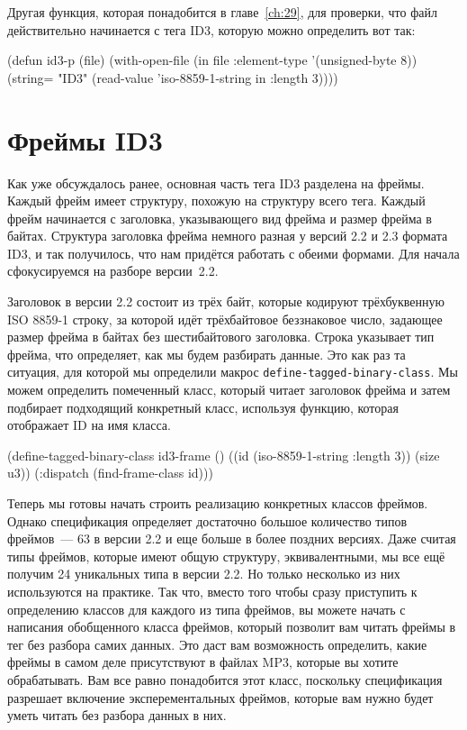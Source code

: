 Другая функция, которая понадобится в главе~\ref{ch:29}, для проверки, что файл
действительно начинается с тега ID3, которую можно определить вот так:

\begin{myverb}
(defun id3-p (file)
  (with-open-file (in file :element-type '(unsigned-byte 8))
    (string= "ID3" (read-value 'iso-8859-1-string in :length 3))))
\end{myverb}

\section{Фреймы ID3}

Как уже обсуждалось ранее, основная часть тега ID3 разделена на фреймы.  Каждый фрейм
имеет структуру, похожую на структуру всего тега.  Каждый фрейм начинается с заголовка,
указывающего вид фрейма и размер фрейма в байтах.  Структура заголовка фрейма немного
разная у версий 2.2 и 2.3 формата ID3, и так получилось, что нам придётся работать с
обеими формами. Для начала сфокусируемся на разборе версии~2.2.

Заголовок в версии 2.2 состоит из трёх байт, которые кодируют трёхбуквенную ISO 8859-1
строку, за которой идёт трёхбайтовое беззнаковое число, задающее размер
фрейма в байтах без шестибайтового заголовка.  Строка указывает тип фрейма, что
определяет, как мы будем разбирать данные.  Это как раз та ситуация, для которой мы
определили макрос \lstinline{define-tagged-binary-class}.  Мы можем определить помеченный класс,
который читает заголовок фрейма и затем подбирает подходящий конкретный класс, используя
функцию, которая отображает ID на имя класса.

\begin{myverb}
(define-tagged-binary-class id3-frame ()
  ((id (iso-8859-1-string :length 3))
   (size u3))
  (:dispatch (find-frame-class id)))
\end{myverb}

Теперь мы готовы начать строить реализацию конкретных классов фреймов.  Однако
спецификация определяет достаточно большое количество типов фреймов~--- 63 в версии 2.2 и
еще больше в более поздних версиях.  Даже считая типы фреймов, которые имеют общую
структуру, эквивалентными, мы все ещё получим 24 уникальных типа в версии 2.2.  Но только
несколько из них используются на практике.  Так что, вместо того чтобы сразу приступить к
определению классов для каждого из типа фреймов, вы можете начать с написания обобщенного
класса фреймов, который позволит вам читать фреймы в тег без разбора самих данных.  Это
даст вам возможность определить, какие фреймы в самом деле присутствуют в файлах MP3,
которые вы хотите обрабатывать.  Вам все равно понадобится этот класс, поскольку
спецификация разрешает включение эксперементальных фреймов, которые вам нужно будет уметь
читать без разбора данных в них.

